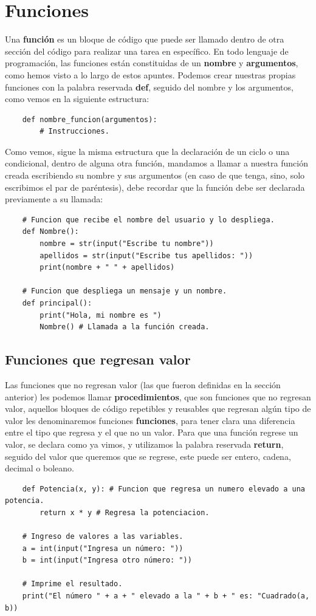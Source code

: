 \section{Funciones}
\hspace{0.55cm}Una \textbf{función} es un bloque de código que puede ser llamado dentro de otra sección del código para realizar una tarea en específico. En todo lenguaje de programación, las funciones están constituidas de un \textbf{nombre} y \textbf{argumentos}, como hemos visto a lo largo de estos apuntes. Podemos crear nuestras propias funciones con la palabra reservada \textbf{def}, seguido del nombre y los argumentos, como vemos en la siguiente estructura:
\begin{lstlisting}
	def nombre_funcion(argumentos):
		# Instrucciones.
\end{lstlisting}

Como vemos, sigue la misma estructura que la declaración de un ciclo o una condicional, dentro de alguna otra función, mandamos a llamar a nuestra función creada escribiendo su nombre y sus argumentos (en caso de que tenga, sino, solo escribimos el par de paréntesis), debe recordar que la función debe ser declarada previamente a su llamada:
\begin{lstlisting}
	# Funcion que recibe el nombre del usuario y lo despliega.
	def Nombre():
		nombre = str(input("Escribe tu nombre"))
		apellidos = str(input("Escribe tus apellidos: "))
		print(nombre + " " + apellidos)

	# Funcion que despliega un mensaje y un nombre.
	def principal():
		print("Hola, mi nombre es ")
		Nombre() # Llamada a la función creada.
\end{lstlisting}


\subsection{Funciones que regresan valor}
\hspace{0.55cm}Las funciones que no regresan valor (las que fueron definidas en la sección anterior) les podemos llamar \textbf{procedimientos}, que son funciones que no regresan valor, aquellos bloques de código repetibles y reusables que regresan algún tipo de valor les denominaremos funciones \textbf{funciones}, para tener clara una diferencia entre el tipo que regresa y el que no un valor. Para que una función regrese un valor, se declara como ya vimos, y utilizamos la palabra reservada \textbf{return}, seguido del valor que queremos que se regrese, este puede ser entero, cadena, decimal o boleano.
\begin{lstlisting}
	def Potencia(x, y): # Funcion que regresa un numero elevado a una potencia.
		return x * y # Regresa la potenciacion.

	# Ingreso de valores a las variables.
	a = int(input("Ingresa un número: "))
	b = int(input("Ingresa otro número: "))
	
	# Imprime el resultado.
	print("El número " + a + " elevado a la " + b + " es: "Cuadrado(a, b))
\end{lstlisting}

